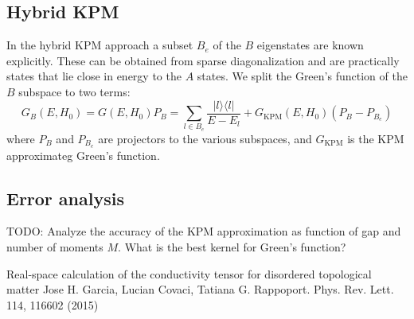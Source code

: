 \documentclass[10pt, onecolumn, aps, prb, superscriptaddress, floatfix, showpacs, notitlepage]{revtex4-1}
\begin{document}
\subsection{Hybrid KPM}

In the hybrid KPM approach a subset $B_e$ of the $B$ eigenstates are known explicitly.
These can be obtained from sparse diagonalization and are practically states that lie close in energy to the $A$ states.
We split the Green's function of the $B$ subspace to two terms:
\begin{equation}
G_B(E, H_0) = G(E, H_0) P_B = \sum_{l\in B_e} \frac{| l \rangle\langle l |}{E - E_l} + G_{\text{KPM}}(E, H_0) (P_B - P_{B_e})
\end{equation}
where $P_B$ and $P_{B_e}$ are projectors to the various subspaces, and $G_{\text{KPM}}$ is the KPM approximateg Green's function.

\subsection{Error analysis}

TODO:
Analyze the accuracy of the KPM approximation as function of gap and number of moments $M$.
What is the best kernel for Green's function?




\begin{thebibliography}{2}
Real-space calculation of the conductivity tensor for disordered topological matter
Jose H. Garcia, Lucian Covaci, Tatiana G. Rappoport. Phys. Rev. Lett. 114, 116602 (2015)
\end{thebibliography}
\end{document}
